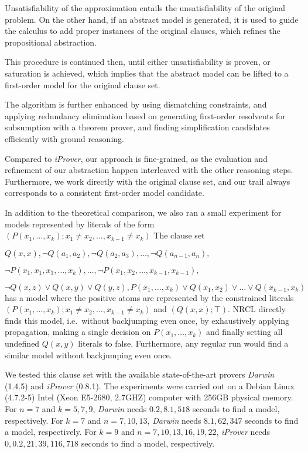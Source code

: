 \documentclass[a4paper]{article}
\newcommand{\ie}{i.e.\ }
\begin{document}
Unsatisfiability of the approximation entails the unsatisfiability of the original problem.
On the other hand, if an abstract model is generated, it is used to guide the calculus to add 
proper instances of the original clauses, which refines the propositional abstraction.

This procedure is continued then, until either unsatisfiability is proven, or saturation is achieved, 
which implies that the abstract model can be lifted to a first-order model for the original clause set.

The algorithm is further enhanced by using dismatching constraints, and applying redundancy elimination based 
on generating first-order resolvents for subsumption with a theorem prover, and finding simplification candidates efficiently
with ground reasoning.

Compared to \emph{iProver}, our approach is fine-grained, 
as the evaluation and refinement of our abstraction happen interleaved with the other reasoning steps.
Furthermore, we work directly with the original clause set, and our trail always corresponds 
to a consistent first-order model candidate.

In addition to the theoretical comparison, we also ran a small experiment for models represented by literals of the form 
$(P(x_1,\ldots,x_k);x_1\neq x_2,\ldots,x_{k-1}\neq x_k)$
The clause set

  $Q(x,x), \neg Q(a_1, a_2),  \neg Q(a_2, a_3), \ldots, \neg Q(a_{n-1}, a_n),$
	
  $\neg P(x_1,x_1, x_3,\ldots, x_k), \ldots, \neg P(x_1,x_2,\ldots, x_{k-1},x_{k-1}),$
	
  $\neg Q(x,z)\lor Q(x,y)\lor Q(y,z), P(x_1,\ldots,x_k) \vee Q(x_1,x_2)\vee\ldots\vee Q(x_{k-1}, x_k)$\newline
has a model where the positive atoms are represented by the constrained literals 
$(P(x_1,\ldots,x_k);x_1\neq x_2,\ldots,x_{k-1}\neq x_k)$
and $(Q(x,x);\top)$. NRCL directly finds this model, \ie without backjumping even once, 
by exhaustively applying propagation, making a single decision on $P(x_1,\ldots,x_k)$ and finally 
setting all undefined $Q(x,y)$ literals to false. Furthermore, any regular run would find a similar model without 
backjumping even once.

We tested this clause set with the available state-of-the-art provers \emph{Darwin}
(1.4.5) and \emph{iProver} (0.8.1).
The experiments were carried out on a Debian Linux
(4.7.2-5) Intel (Xeon E5-2680, 2.7GHZ) computer with 256GB physical memory.
For $n=7$ and $k=5,7,9$, \emph{Darwin} needs $0.2, 8.1, 518$ seconds to find a model, respectively.
For $k=7$ and $n=7,10,13$, \emph{Darwin} needs $8.1, 62, 347$ seconds to find a model, respectively.
For $k=9$ and $n=7,10,13,16,19,22$, \emph{iProver} needs $0, 0.2, 21, 39, 116, 718$ seconds to find a model, 
respectively.
\end{document}
